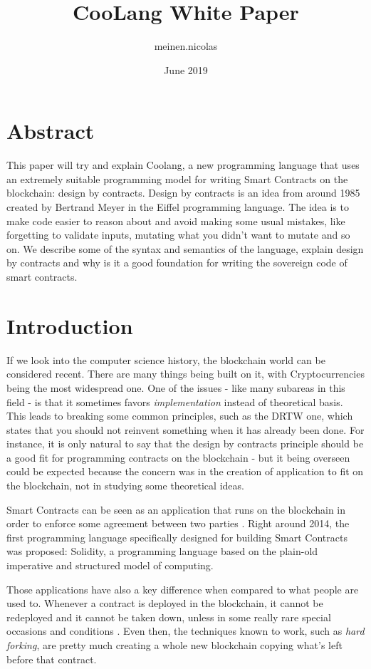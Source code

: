 \documentclass{article}
\title{CooLang White Paper}
\author{meinen.nicolas }
\date{June 2019}
\begin{document}
\maketitle

\section{Abstract}

This paper will try and explain Coolang, a new programming language that uses an extremely suitable programming model for writing Smart Contracts on the blockchain: design by contracts. Design by contracts is an idea from around 1985 created by Bertrand Meyer in the Eiffel programming language. The idea is to make code easier to reason about and avoid making some usual mistakes, like forgetting to validate inputs, mutating what you didn't want to mutate and so on. We describe some of the syntax and semantics of the language, explain design by contracts and why is it a good foundation for writing the sovereign code of smart contracts. 

\section{Introduction}

If we look into the computer science history, the blockchain world can be considered recent. There are many things being built on it, with Cryptocurrencies being the most widespread one. One of the issues - like many subareas in this field - is that it sometimes favors \textit{implementation} instead of theoretical basis. This leads to breaking some common principles, such as the DRTW one, which states that you should not reinvent something when it has already been done. For instance, it is only natural to say that the design by contracts principle should be a good fit for programming contracts on the blockchain - but it being overseen could be expected because the concern was in the creation of application to fit on the blockchain, not in studying some theoretical ideas.

Smart Contracts can be seen as an application that runs on the blockchain in order to enforce some agreement between two parties \cite{smartcontractsaprimer}. Right around 2014, the first programming language specifically designed for building Smart Contracts was proposed: Solidity, a programming language based on the plain-old imperative and structured model of computing. 

Those applications have also a key difference when compared to what people are used to. Whenever a contract is deployed in the blockchain, it cannot be redeployed and it cannot be taken down, unless in some really rare special occasions and conditions \cite{attacks}. Even then, the techniques known to work, such as \textit{hard forking}, are pretty much creating a whole new blockchain copying what's left before that contract.
\end{document}
